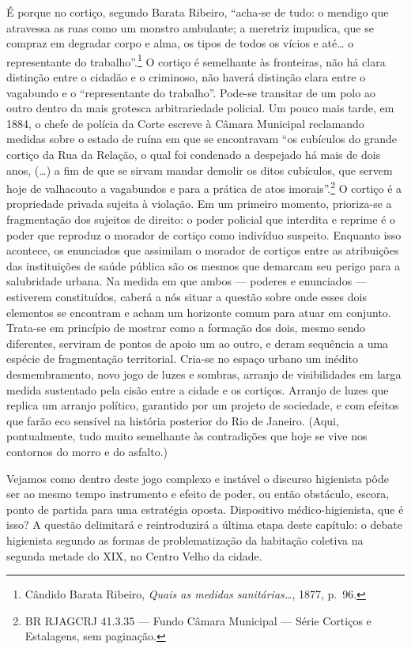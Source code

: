 É porque no cortiço, segundo Barata Ribeiro, ``acha-se de tudo: o
mendigo que atravessa as ruas como um monstro ambulante; a meretriz
impudica, que se compraz em degradar corpo e alma, os tipos de todos os
vícios e até\dots{} o representante do trabalho''.\footnote{Cândido Barata
  Ribeiro, \textit{Quais as medidas sanitárias\ldots{}}, 1877, p.~96.} O
cortiço é semelhante às fronteiras, não há clara distinção entre o
cidadão e o criminoso, não haverá distinção clara entre o vagabundo e o
``representante do trabalho''. Pode-se transitar de um polo ao outro
dentro da mais grotesca arbitrariedade policial. Um pouco mais tarde, em
1884, o chefe de polícia da Corte escreve à Câmara Municipal reclamando
medidas sobre o estado de ruína em que se encontravam ``os cubículos do
grande cortiço da Rua da Relação, o qual foi condenado a despejado há
mais de dois anos, (\ldots{}) a fim de que se sirvam mandar demolir os
ditos cubículos, que servem hoje de valhacouto a vagabundos e para a
prática de atos imorais''.\footnote{BR RJAGCRJ 41.3.35 --- Fundo Câmara
  Municipal --- Série Cortiços e Estalagens, sem paginação.} O cortiço é
a propriedade privada sujeita à violação. Em um primeiro momento,
prioriza-se a fragmentação dos sujeitos de direito: o poder policial que
interdita e reprime é o poder que reproduz o morador de cortiço como
indivíduo suspeito. Enquanto isso acontece, os enunciados que assimilam
o morador de cortiços entre as atribuições das instituições de saúde
pública são os mesmos que demarcam seu perigo para a salubridade urbana.
Na medida em que ambos --- poderes e enunciados --- estiverem
constituídos, caberá a nós situar a questão sobre onde esses dois
elementos se encontram e acham um horizonte comum para atuar em
conjunto. Trata-se em princípio de mostrar como a formação dos dois,
mesmo sendo diferentes, serviram de pontos de apoio um ao outro, e deram
sequência a uma espécie de fragmentação territorial. Cria-se no espaço
urbano um inédito desmembramento, novo jogo de luzes e sombras, arranjo
de visibilidades em larga medida sustentado pela cisão entre a cidade e
os cortiços. Arranjo de luzes que replica um arranjo político, garantido
por um projeto de sociedade, e com efeitos que farão eco sensível na
história posterior do Rio de Janeiro. (Aqui, pontualmente, tudo muito
semelhante às contradições que hoje se vive nos contornos do morro e do
asfalto.)

Vejamos como dentro deste jogo complexo e instável o discurso higienista
pôde ser ao mesmo tempo instrumento e efeito de poder, ou então
obstáculo, escora, ponto de partida para uma estratégia oposta.
Dispositivo médico-higienista, que é isso? A questão delimitará e
reintroduzirá a última etapa deste capítulo: o debate higienista segundo
as formas de problematização da habitação coletiva na segunda metade do
XIX, no Centro Velho da cidade.

